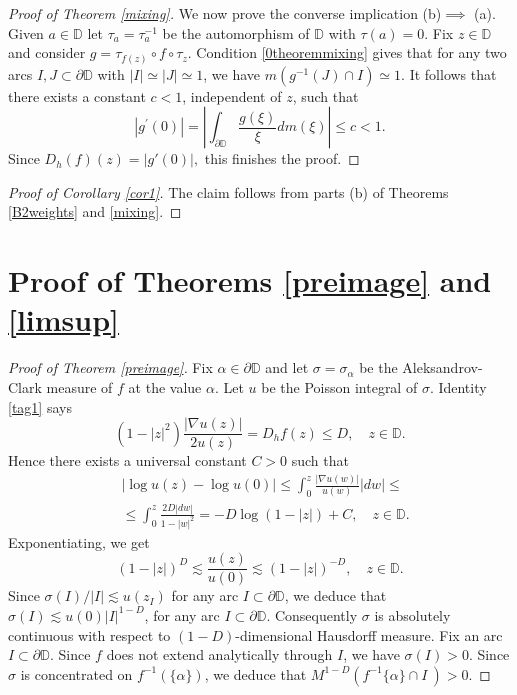 \documentclass[a4paper,12pt]{article}
\theoremstyle{definition}
\numberwithin{equation}{section}
\newcommand{\D}{\mathbb D}
\begin{document}
\begin{proof}[Proof of Theorem \ref{mixing}]
We now prove the converse implication (b)$\implies$ (a). Given $a \in \mathbb{D}$ let $\tau_{a}=\tau_{a}^{-1}$ be the automorphism of $\D$ with $\tau(a)=0$. Fix $z \in \mathbb{D}$ and consider $g=\tau_{f(z)} \circ f \circ \tau_{z}$. Condition \eqref{0theoremmixing} gives that for any two arcs $I, J \subset \partial \mathbb{D}$ with $|I| \simeq |J| \simeq 1 $, we have $m\left(g^{-1}(J) \cap I\right) \simeq 1$. It follows that there exists a constant $c<1$, independent of $z$, such that
$$
\left|g^{\prime}(0)\right|=\left|\int_{\partial \mathbb{D}} \frac{g(\xi)}{\xi} dm (\xi)\right| \leqslant c<1 . 
$$
Since $D_h (f) (z) = |g'(0)|,$ this finishes the proof. \end{proof}

\begin{proof}[Proof of Corollary \ref{cor1}]
The claim follows from parts (b) of Theorems \ref{B2weights} and \ref{mixing}. 
\end{proof}    

\section{Proof of Theorems \ref{preimage} and \ref{limsup}}\label{section4}

\begin{proof}[Proof of Theorem \ref{preimage}]
Fix $\alpha \in \partial \D$ and let $\sigma=\sigma_{\alpha}$ be the Aleksandrov-Clark measure of $f$ at the value $\alpha$. Let $u$ be the Poisson integral of $\sigma$. Identity \eqref{tag1} says 
$$
\left(1-|z|^{2}\right) \frac{|\nabla u(z)|}{2 u(z)}=D_{h} f(z) \leq D, \quad z \in \mathbb{D} .
$$
Hence there exists a universal constant $C>0$ such that 
$$
\begin{aligned}
& |\log u(z)-\log u(0)| \leq \int_{0}^{z} \frac{|\nabla u(w)|}{u(w)}|d w| \leq \\
& \leqslant \int_{0}^{z} \frac{2 D|d w|}{1-|w|^{2}}= - D \log (1- |z|) + C , \quad z \in \mathbb{D} .
\end{aligned}
$$
Exponentiating, we get
$$
(1-|z|)^{D} \lesssim \frac{u(z)}{u(0)} \lesssim (1-|z|)^{-D},\quad  z \in \mathbb{D} . 
$$
Since $\sigma (I) / |I| \lesssim u\left(z_{I}\right)$ for any arc $I \subset \partial \D$, we deduce that $\sigma (I) \lesssim u(0)|I|^{1-D}$, for any arc $I \subset \partial \D$. Consequently $\sigma$ is absolutely continuous with respect to $(1-D)$-dimensional Hausdorff measure. Fix an arc $I \subset \partial \D$. Since $f$ does not extend analytically through $I$, we have $\sigma (I)>0$. Since $\sigma$ is concentrated on $ f^{-1}(\{\alpha\}) $, we deduce that $M^{1-D} (f^{-1}\{\alpha\} \cap I \ )>0$. 
\end{proof}
\end{document}
